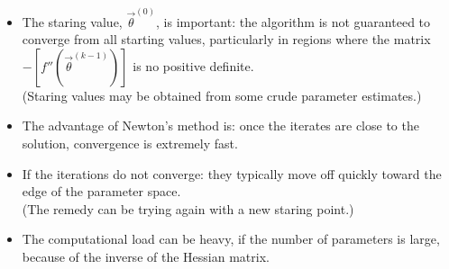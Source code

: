 \documentclass[10pt]{beamer}
\begin{document}
\begin{frame}
\begin{itemize}
\begin{itemize}

\item The staring value, $\vec \theta ^{(0)}$, is important: the algorithm is not guaranteed to converge from all starting values, particularly in regions where the matrix $- [f''(\vec \theta^{(k-1)})]$ is no positive definite. \\

(Staring values may be obtained from some crude parameter estimates.) 
\smallskip

\item The advantage of Newton's method is: once the iterates are close to the solution, convergence is extremely fast.
\smallskip

\item If the iterations do not converge: they typically  move off quickly toward the edge of the parameter space. \\

(The remedy can be trying again with a new staring point.) 
\smallskip

\item The computational load can be heavy, if the number of parameters is large, because of the inverse of the Hessian matrix. 

\end{itemize}
\end{itemize}
\end{frame}
\end{document}
